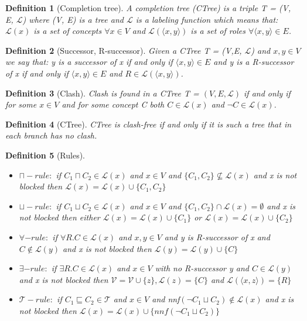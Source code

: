 \documentclass[12pt,a4paper]{article}
\newtheorem{definition}{Definition}[subsection]
\begin{document}
\begin{definition}[Completion tree]
A completion tree (CTree) is a triple T = (V, E, $\mathcal{L}$) where (V, E)
is a tree and $\mathcal{L}$ is a labeling function which means that:
$\mathcal{L}(x)$ is a set of concepts $\forall x \in V$ and
$\mathcal{L}(\langle x, y \rangle )$ is a set of roles $\forall \langle x, y \rangle \in E$.	
\end{definition}

\begin{definition}[Successor, R-successor]
Given a CTree T = (V,E, $\mathcal{L}$) and $x,y \in V$ we say that: y is a successor of x if and only if $\langle x,y \rangle \in E$ and y is a R-successor of x if and only if $\langle x,y \rangle \in E$ and $R \in \mathcal{L}(\langle x,y \rangle)$.
\end{definition}

\begin{definition}[Clash]
Clash is found in a CTree T = $(V,E, \mathcal{L})$ if and only if for some $x \in V$ and for some concept C both $C \in \mathcal{L}(x)$ and $\neg C \in \mathcal{L}(x)$.
	
\end{definition}

\begin{definition}[CTree]
CTree is clash-free if and only if it is such a tree that in each branch has no clash.
\end{definition}

\begin{definition}[Rules]
~\begin{itemize}
	\item $\sqcap-rule:$ if $C_{1} \sqcap C_{2} \in \mathcal{L}(x)$ and $x \in V$ and $\{ C_{1}, C_{2} \} \not \subseteq \mathcal{L}(x)$ and x is not blocked then $\mathcal{L}(x) = \mathcal{L}(x) \cup \{ C_{1}, C_{2} \}$
	
	\item $\sqcup-rule:$ if $C_{1} \sqcup C_{2} \in \mathcal{L}(x)$ and $x \in V$ and $ \{ C_{1}, C_{2} \} \cap \mathcal{L}(x) = \emptyset$ and x is not blocked then either $\mathcal{L}(x) = \mathcal{L}(x) \cup \{ C_{1} \}$ or $\mathcal{L}(x) = \mathcal{L}(x) \cup \{ C_{2} \}$
	
	\item $\forall-rule:$ if $\forall R.C \in \mathcal{L}(x)$ and $x,y \in V$ and y is R-successor of x and $C \not \in \mathcal{L}(y)$ and x is not blocked then $\mathcal{L}(y) = \mathcal{L}(y) \cup \{ C \}$
	
	\item $\exists-rule:$ if $\exists R.C \in \mathcal{L}(x)$ and $x \in V$ with no R-successor y and $C \in \mathcal{L}(y)$ and x is not blocked then $\mathcal{V} = \mathcal{V} \cup \{ z \}, \mathcal{L}(z) = \{ C\}$ and $\mathcal{L}( \langle x, z \rangle ) = \{ R \}$
	
	\item $\mathcal{T}-rule:$ if $C_{1} \sqsubseteq C_{2} \in \mathcal{T}$ and $x \in V$ and nnf$(\neg C_{1} \sqcup C_{2}) \not \in \mathcal{L}(x)$ and x is not blocked then $\mathcal{L}(x) = \mathcal{L}(x) \cup \{ nnf(\neg C_{1} \sqcup C_{2}) \}$
\end{itemize}
\end{definition}
\end{document}
